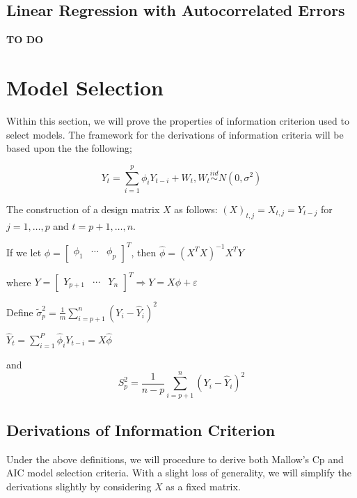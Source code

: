 \documentclass[]{book}
\theoremstyle{definition}
\theoremstyle{definition}
\theoremstyle{definition}
\theoremstyle{remark}
\begin{document}
{{\section{Linear Regression with Autocorrelated
Errors}\label{linear-regression-with-autocorrelated-errors}}

\textbf{TO DO}

\hypertarget{model-selection}{%
\chapter{Model Selection}\label{model-selection}}

Within this section, we will prove the properties of information
criterion used to select models. The framework for the derivations of
information criteria will be based upon the the following;

\[{Y_t} = \sum\limits_{i = 1}^p {{\phi _i}{Y_{t - i}} + {W_t}} ,{W_t}\mathop  \sim \limits^{iid} N\left( {0,{\sigma ^2}} \right)\]

The construction of a design matrix \(X\) as follows:
\({\left( X \right)_{t,j}} = {X_{t,j}} = {Y_{t - j}}\) for
\(j = 1, \ldots, p\) and \(t = p + 1, \ldots, n\).

If we let
\(\phi = {\left[ {\begin{array}{*{20}{c}}  {{\phi _1}}& \cdots &{{\phi _p}} \end{array}} \right]^T}\),
then \(\hat \phi = {\left( {{X^T}X} \right)^{ - 1}}{X^T}Y\)

where
\(Y = {\left[ {\begin{array}{*{20}{c}}  {{Y_{p + 1}}}& \cdots &{{Y_n}} \end{array}} \right]^T} \Rightarrow Y = X\phi + \varepsilon\)

Define
\(\tilde \sigma _p^2 = \frac{1}{m}\sum\limits_{i = p + 1}^n {{{\left( {{Y_i} - {{\hat Y}_i}} \right)}^2}}\)

\({\hat Y_t} = \sum\limits_{i = 1}^P {{{\hat \phi }_i}{Y_{t - i}}} = X\hat \phi\)

and
\[S_p^2 = \frac{1}{{n - p}}\sum\limits_{i = p + 1}^n {{{\left( {{Y_i} - {{\hat Y}_i}} \right)}^2}} \]

\hypertarget{derivations-of-information-criterion}{%
\section{Derivations of Information
Criterion}\label{derivations-of-information-criterion}}

Under the above definitions, we will procedure to derive both Mallow's
Cp and AIC model selection criteria. With a slight loss of generality,
we will simplify the derivations slightly by considering \(X\) as a
fixed matrix.

}
\end{document}
